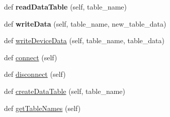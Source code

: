 \begin{DoxyCompactItemize}
def {\bfseries read\+Data\+Table} (self, table\+\_\+name)
\item 
\mbox{\label{classDatabaseConnect_1_1DatabaseConnect_a1762e7610b132ea843983be4804f246a}} 
def {\bfseries write\+Data} (self, table\+\_\+name, new\+\_\+table\+\_\+data)
\item 
def \mbox{\hyperlink{classDatabaseConnect_1_1DatabaseConnect_a9bcba3ce08f6076f76336bb8294c4bef}{write\+Device\+Data}} (self, table\+\_\+name, table\+\_\+data)
\item 
def \mbox{\hyperlink{classDatabaseConnect_1_1DatabaseConnect_a704ace4aa1ace43677185321c10ca625}{connect}} (self)
\item 
def \mbox{\hyperlink{classDatabaseConnect_1_1DatabaseConnect_a120289c8d90c8d59bfcc60be7b158a4a}{disconnect}} (self)
\item 
def \mbox{\hyperlink{classDatabaseConnect_1_1DatabaseConnect_a83e5e84038d73d83214cd27c3955758f}{create\+Data\+Table}} (self, table\+\_\+name)
\item 
def \mbox{\hyperlink{classDatabaseConnect_1_1DatabaseConnect_a243061ffa39df83640aa72b8fb234772}{get\+Table\+Names}} (self)
\end{DoxyCompactItemize}
